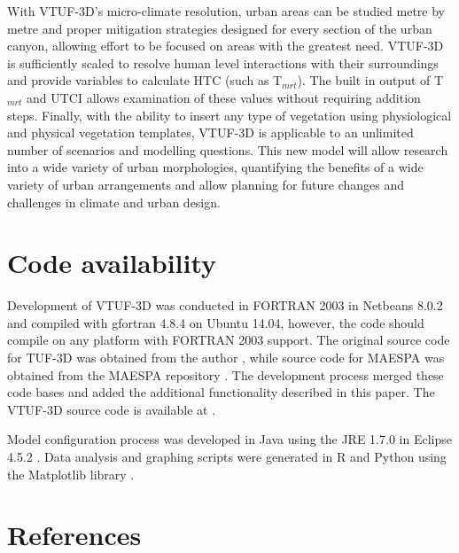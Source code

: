 \documentclass[final,3p,times,authoryear]{elsarticle}
\begin{document}
With VTUF-3D's micro-climate resolution, urban areas can be studied metre by metre and proper mitigation strategies designed for every section of the urban canyon, allowing effort to be focused on areas with the greatest need. VTUF-3D is sufficiently scaled to resolve human level interactions with their surroundings and provide variables to calculate HTC (such as T$_{mrt}$). The built in output of T$_{mrt}$ and UTCI allows examination of these values without requiring addition steps. Finally, with the ability to insert any type of vegetation using physiological and physical vegetation templates, VTUF-3D is applicable to an unlimited number of scenarios and modelling questions. This new model will allow research into a wide variety of urban morphologies, quantifying the benefits of a wide variety of urban arrangements and allow planning for future changes and challenges in climate and urban design.

\section{Code availability}\label{sec:available}

Development of VTUF-3D was conducted in FORTRAN 2003 \citep{GNU2016a} in Netbeans 8.0.2 \citep{Netbeans2016} and compiled with gfortran 4.8.4 \citep{GNU2016} on Ubuntu 14.04, however, the code should compile on any platform with FORTRAN 2003 support. The original source code for TUF-3D was obtained from the author \citep{Krayenhoff2007}, while source code for MAESPA was obtained from the MAESPA repository \citep{Duursma2016}. The development process merged these code bases and added the additional functionality described in this paper. The VTUF-3D source code is available at \cite{Nice2016c}.

Model configuration process was developed in Java using the JRE 1.7.0 \citep{Oracle2016} in Eclipse 4.5.2 \citep{Eclipse2016}. Data analysis and graphing scripts were generated in R \citep{R2013} and Python \citep{Python2016} using the Matplotlib library \citep{Hunter2007}. 


\section{References}\label{sec:ref}
   
  

\end{document}
